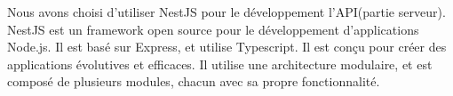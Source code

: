 Nous avons choisi d'utiliser NestJS pour le développement l'API(partie serveur).
NestJS est un framework open source pour le développement d'applications
Node.js. Il est basé sur Express, et utilise Typescript. Il est conçu pour
créer des applications évolutives et efficaces. Il utilise une architecture
modulaire, et est composé de plusieurs modules, chacun avec sa propre
fonctionnalité. 